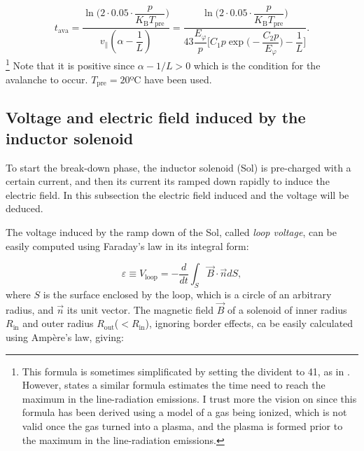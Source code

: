 \documentclass[a4paper,12pt,oneside]{book}
\begin{document}
\begin{equation}\label{ec t_ava}
t_\text{ava}= \dfrac{\ln \Big(2\cdot 0.05 \cdot \dfrac{p}{K_\text{B} T_\text{pre}} \Big) }{v_\parallel (\alpha-\dfrac{1}{L})}=\dfrac{\ln \Big(2\cdot 0.05 \cdot \dfrac{p}{K_\text{B} T_\text{pre}} \Big) }{43 \dfrac{E_\varphi}{p}\Big[ C_1 p \exp \Big(-\dfrac{C_2 p}{E_\varphi} \Big)-\dfrac{1}{L} \Big]}.
\end{equation}\footnote{This formula is sometimes simplificated by setting the divident to 41, as in \cite{Lloyd_1991}. However, \cite{Lloyd_1991} states a similar formula estimates the time need to reach the maximum in the line-radiation emissions. I trust more the vision on \cite{ITER_2019} since this formula has been derived using a model of a gas being ionized, which is not valid once the gas turned into a plasma, and the plasma is formed prior to the maximum in the line-radiation emissions.}
Note that it is positive since $\alpha-1/L>0$ which is the condition for the avalanche to occur. $T_\text{pre}=20$ºC have been used.



\subsection{Voltage and electric field induced by the inductor solenoid}

To start the break-down phase, the inductor solenoid (Sol) is pre-charged with a certain current, and then its current its ramped down rapidly to induce the electric field. In this subsection the electric field induced and the voltage will be deduced.


The voltage induced by the ramp down of the Sol, called \textit{loop voltage}, can be easily computed using Faraday's law in its integral form:

\begin{equation}\label{ec_Faraday_loop}
\varepsilon \equiv V_\text{loop} = -\dfrac{d}{dt} \int_S \vec{B} \cdot \vec{n} dS,
\end{equation}
where $S$ is the surface enclosed by the loop, which is a circle of an arbitrary radius, and $\vec{n}$ its unit vector. The magnetic field $\vec{B}$ of a solenoid of inner radius $R_\text{in}$ and outer radius $R_\text{out}$($<R_\text{in}$), ignoring border effects, ca be easily calculated using Ampère's law, giving:
\end{document}
